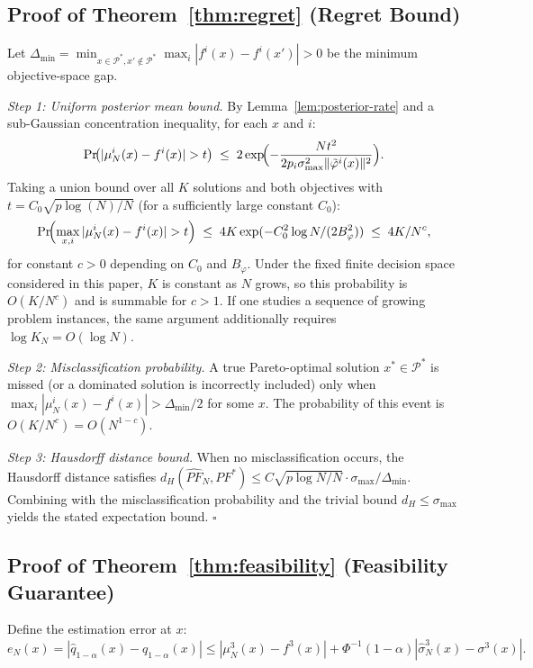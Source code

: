 \documentclass[12pt]{article}
\theoremstyle{plain}
\theoremstyle{definition}
\theoremstyle{remark}
\begin{document}
\subsection{Proof of Theorem~\ref{thm:regret} (Regret Bound)}\label{app:proof_regret}

Let $\Delta_{\min} = \min_{x \in \mathcal{P}^*, x' \notin \mathcal{P}^*}
\max_i |f^i(x) - f^i(x')| > 0$ be the minimum objective-space gap.

\emph{Step 1: Uniform posterior mean bound.}
By Lemma~\ref{lem:posterior-rate} and a sub-Gaussian concentration inequality,
for each $x$ and $i$:
\[
  \Pr\!\bigl(|\mu^i_N(x) - f^i(x)| > t\bigr)
  \;\leq\; 2\exp\!\Bigl(-\frac{Nt^2}{2 p_i \sigma^2_{\max} \|\tilde{\varphi}^i(x)\|^2}\Bigr).
\]
Taking a union bound over all $K$ solutions and both objectives with
$t = C_0\sqrt{p \log(N) / N}$ (for a sufficiently large constant $C_0$):
\[
  \Pr\!\Bigl(\max_{x,i} |\mu^i_N(x) - f^i(x)| > t\Bigr)
  \;\leq\; 4K \exp(-C_0^2 \log N / (2B^2_\varphi))
  \;\leq\; 4K/N^c,
\]
for constant $c > 0$ depending on $C_0$ and $B_\varphi$.  Under
the fixed finite decision space considered in this paper, $K$ is
constant as $N$ grows, so this probability is $O(K/N^c)$ and is
summable for $c>1$.  If one studies a sequence of growing problem
instances, the same argument additionally requires
$\log K_N=O(\log N)$.

\emph{Step 2: Misclassification probability.}
A true Pareto-optimal solution $x^* \in \mathcal{P}^*$ is missed (or a
dominated solution is incorrectly included) only when
$\max_i |\mu^i_N(x) - f^i(x)| > \Delta_{\min}/2$ for some $x$.
The probability of this event is $O(K/N^c) = O(N^{1-c})$.

\emph{Step 3: Hausdorff distance bound.}
When no misclassification occurs, the Hausdorff distance satisfies
$d_H(\widehat{PF}_N, PF^*) \leq C\sqrt{p \log N/N} \cdot \sigma_{\max}/\Delta_{\min}$.
Combining with the misclassification probability and the trivial bound
$d_H \leq \sigma_{\max}$ yields the stated expectation bound.
\hfill$\square$

\subsection{Proof of Theorem~\ref{thm:feasibility} (Feasibility Guarantee)}\label{app:proof_feasibility}

Define the estimation error at $x$:
\[
  e_N(x) = |\hat{q}_{1-\alpha}(x) - q_{1-\alpha}(x)|
  \leq |\mu^3_N(x) - f^3(x)|
     + \Phi^{-1}(1-\alpha) |\hat{\sigma}^3_N(x) - \sigma^3(x)|.
\]
\end{document}
